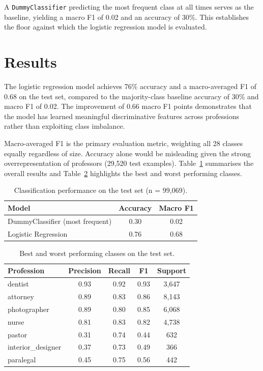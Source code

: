 \documentclass[11pt, a4paper]{article}
\begin{document}
A \texttt{DummyClassifier} predicting the most frequent class at all times 
serves as the baseline, yielding a macro F1 of 0.02 and an accuracy of 30\%. 
This establishes the floor against which the logistic regression model is 
evaluated.

\section{Results}

The logistic regression model achieves 76\% accuracy and a macro-averaged 
F1 of 0.68 on the test set, compared to the majority-class baseline accuracy 
of 30\% and macro F1 of 0.02. The improvement of 0.66 macro F1 points 
demonstrates that the model has learned meaningful discriminative features 
across professions rather than exploiting class imbalance.

Macro-averaged F1 is the primary evaluation metric, weighting all 28 classes 
equally regardless of size. Accuracy alone would be misleading given the 
strong overrepresentation of professors (29,520 test examples). 
Table~\ref{tab:results_summary} summarises the overall results and 
Table~\ref{tab:results_per_class} highlights the best and worst performing 
classes.

\begin{table}[h]
\centering
\begin{tabular}{lcc}
\hline
\textbf{Model} & \textbf{Accuracy} & \textbf{Macro F1} \\
\hline
DummyClassifier (most frequent) & 0.30 & 0.02 \\
Logistic Regression             & 0.76 & 0.68 \\
\hline
\end{tabular}
\caption{Classification performance on the test set (n = 99,069).}
\label{tab:results_summary}
\end{table}

\begin{table}[h]
\centering
\begin{tabular}{lcccc}
\hline
\textbf{Profession} & \textbf{Precision} & \textbf{Recall} & 
\textbf{F1} & \textbf{Support} \\
\hline
dentist            & 0.93 & 0.92 & 0.93 & 3{,}647 \\
attorney           & 0.89 & 0.83 & 0.86 & 8{,}143 \\
photographer       & 0.89 & 0.80 & 0.85 & 6{,}068 \\
nurse              & 0.81 & 0.83 & 0.82 & 4{,}738 \\
\hline
pastor             & 0.31 & 0.74 & 0.44 &   632 \\
interior\_designer & 0.37 & 0.73 & 0.49 &   366 \\
paralegal          & 0.45 & 0.75 & 0.56 &   442 \\
\hline
\end{tabular}
\caption{Best and worst performing classes on the test set.}
\label{tab:results_per_class}
\end{table}
\end{document}
